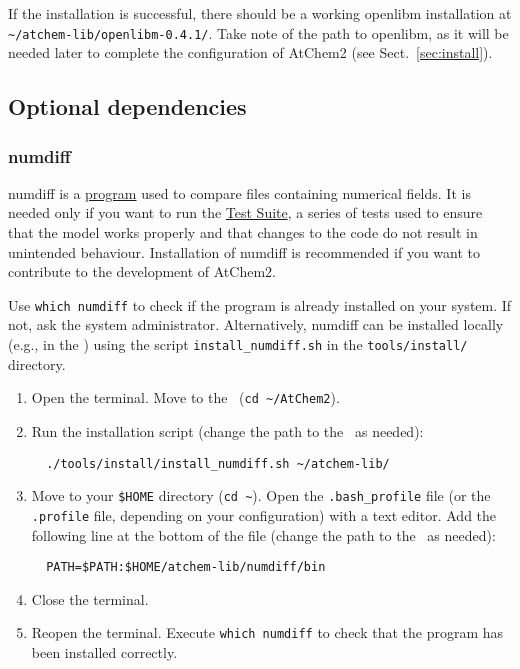 If the installation is successful, there should be a working openlibm
installation at \texttt{\textasciitilde/atchem-lib/openlibm-0.4.1/}.
Take note of the path to openlibm, as it will be needed later to
complete the configuration of AtChem2 (see Sect.~\ref{sec:install}).

\subsection{Optional dependencies} \label{subsec:optional-dependencies}

\subsubsection{numdiff}

numdiff is a \href{https://www.nongnu.org/numdiff/}{program} used to
compare files containing numerical fields. It is needed only if you
want to run the \hyperref[sec:test-suite]{Test Suite}, a series of
tests used to ensure that the model works properly and that changes to
the code do not result in unintended behaviour. Installation of
numdiff is recommended if you want to contribute to the development of
AtChem2.

Use \verb|which numdiff| to check if the program is already installed
on your system. If not, ask the system administrator. Alternatively,
numdiff can be installed locally (e.g., in the \depdir) using the
script \texttt{install\_numdiff.sh} in the \texttt{tools/install/}
directory.

\begin{enumerate}
\item Open the terminal. Move to the \maindir\ (\verb|cd ~/AtChem2|).
\item Run the installation script (change the path to the \depdir\ as
  needed):
  \begin{verbatim}
  ./tools/install/install_numdiff.sh ~/atchem-lib/
  \end{verbatim}
\item Move to your \texttt{\$HOME} directory (\texttt{cd\ \textasciitilde}).
  Open the \texttt{.bash\_profile} file (or the \texttt{.profile}
  file, depending on your configuration) with a text editor. Add the
  following line at the bottom of the file (change the path to the
  \depdir\ as needed):
  \begin{verbatim}
  PATH=$PATH:$HOME/atchem-lib/numdiff/bin
  \end{verbatim}
\item Close the terminal.
\item Reopen the terminal. Execute \verb|which numdiff| to check that
  the program has been installed correctly.
\end{enumerate}

